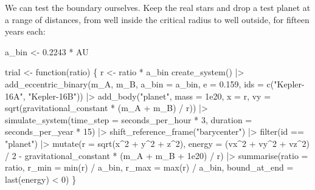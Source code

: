 \documentclass[
  10.5pt,
  letterpaper,
]{scrbook}
\newenvironment{Shaded}{\begin{snugshade}}{\end{snugshade}}
\newcommand{\AttributeTok}[1]{\textcolor[rgb]{0.00,0.00,0.00}{#1}}
\newcommand{\ControlFlowTok}[1]{\textcolor[rgb]{0.00,0.00,0.00}{#1}}
\newcommand{\DecValTok}[1]{\textcolor[rgb]{0.00,0.00,0.00}{#1}}
\newcommand{\FloatTok}[1]{\textcolor[rgb]{0.00,0.00,0.00}{#1}}
\newcommand{\FunctionTok}[1]{\textcolor[rgb]{0.00,0.00,0.00}{#1}}
\newcommand{\NormalTok}[1]{\textcolor[rgb]{0.00,0.00,0.00}{#1}}
\newcommand{\OtherTok}[1]{\textcolor[rgb]{0.00,0.00,0.00}{#1}}
\newcommand{\SpecialCharTok}[1]{\textcolor[rgb]{0.00,0.00,0.00}{#1}}
\newcommand{\StringTok}[1]{\textcolor[rgb]{0.00,0.00,0.00}{#1}}
\theoremstyle{definition}
\theoremstyle{plain}
\theoremstyle{remark}
\begin{document}
We can test the boundary ourselves. Keep the real stars and drop a test
planet at a range of distances, from well inside the critical radius to
well outside, for fifteen years each:

\begin{Shaded}
\begin{Highlighting}[]
\NormalTok{a\_bin }\OtherTok{\textless{}{-}} \FloatTok{0.2243} \SpecialCharTok{*}\NormalTok{ AU}

\NormalTok{trial }\OtherTok{\textless{}{-}} \ControlFlowTok{function}\NormalTok{(ratio) \{}
\NormalTok{  r }\OtherTok{\textless{}{-}}\NormalTok{ ratio }\SpecialCharTok{*}\NormalTok{ a\_bin}
  \FunctionTok{create\_system}\NormalTok{() }\SpecialCharTok{|\textgreater{}}
    \FunctionTok{add\_eccentric\_binary}\NormalTok{(m\_A, m\_B, }\AttributeTok{a\_bin =}\NormalTok{ a\_bin, }\AttributeTok{e =} \FloatTok{0.159}\NormalTok{,}
                         \AttributeTok{ids =} \FunctionTok{c}\NormalTok{(}\StringTok{"Kepler{-}16A"}\NormalTok{, }\StringTok{"Kepler{-}16B"}\NormalTok{)) }\SpecialCharTok{|\textgreater{}}
    \FunctionTok{add\_body}\NormalTok{(}\StringTok{"planet"}\NormalTok{, }\AttributeTok{mass =} \FloatTok{1e20}\NormalTok{, }\AttributeTok{x =}\NormalTok{ r,}
             \AttributeTok{vy =} \FunctionTok{sqrt}\NormalTok{(gravitational\_constant }\SpecialCharTok{*}\NormalTok{ (m\_A }\SpecialCharTok{+}\NormalTok{ m\_B) }\SpecialCharTok{/}\NormalTok{ r)) }\SpecialCharTok{|\textgreater{}}
    \FunctionTok{simulate\_system}\NormalTok{(}\AttributeTok{time\_step =}\NormalTok{ seconds\_per\_hour }\SpecialCharTok{*} \DecValTok{3}\NormalTok{,}
                    \AttributeTok{duration =}\NormalTok{ seconds\_per\_year }\SpecialCharTok{*} \DecValTok{15}\NormalTok{) }\SpecialCharTok{|\textgreater{}}
    \FunctionTok{shift\_reference\_frame}\NormalTok{(}\StringTok{"barycenter"}\NormalTok{) }\SpecialCharTok{|\textgreater{}}
    \FunctionTok{filter}\NormalTok{(id }\SpecialCharTok{==} \StringTok{"planet"}\NormalTok{) }\SpecialCharTok{|\textgreater{}}
    \FunctionTok{mutate}\NormalTok{(}\AttributeTok{r =} \FunctionTok{sqrt}\NormalTok{(x}\SpecialCharTok{\^{}}\DecValTok{2} \SpecialCharTok{+}\NormalTok{ y}\SpecialCharTok{\^{}}\DecValTok{2} \SpecialCharTok{+}\NormalTok{ z}\SpecialCharTok{\^{}}\DecValTok{2}\NormalTok{),}
           \AttributeTok{energy =}\NormalTok{ (vx}\SpecialCharTok{\^{}}\DecValTok{2} \SpecialCharTok{+}\NormalTok{ vy}\SpecialCharTok{\^{}}\DecValTok{2} \SpecialCharTok{+}\NormalTok{ vz}\SpecialCharTok{\^{}}\DecValTok{2}\NormalTok{) }\SpecialCharTok{/} \DecValTok{2} \SpecialCharTok{{-}}
\NormalTok{                    gravitational\_constant }\SpecialCharTok{*}\NormalTok{ (m\_A }\SpecialCharTok{+}\NormalTok{ m\_B }\SpecialCharTok{+} \FloatTok{1e20}\NormalTok{) }\SpecialCharTok{/}\NormalTok{ r) }\SpecialCharTok{|\textgreater{}}
    \FunctionTok{summarise}\NormalTok{(}\AttributeTok{ratio =}\NormalTok{ ratio,}
              \AttributeTok{r\_min =} \FunctionTok{min}\NormalTok{(r) }\SpecialCharTok{/}\NormalTok{ a\_bin, }\AttributeTok{r\_max =} \FunctionTok{max}\NormalTok{(r) }\SpecialCharTok{/}\NormalTok{ a\_bin,}
              \AttributeTok{bound\_at\_end =} \FunctionTok{last}\NormalTok{(energy) }\SpecialCharTok{\textless{}} \DecValTok{0}\NormalTok{)}
\NormalTok{\}}


\end{Highlighting}
\end{Shaded}
\end{document}
